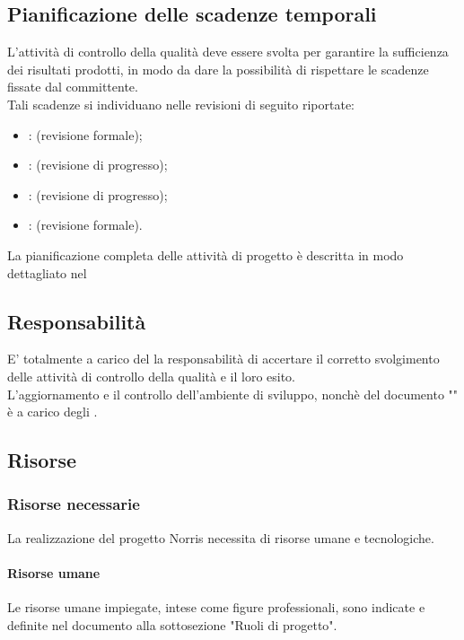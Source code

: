 	\subsection{Pianificazione delle scadenze temporali}
	L'attività di controllo della qualità deve essere svolta per garantire la sufficienza dei risultati prodotti, in modo da dare la possibilità di rispettare le scadenze fissate dal committente.\\
	Tali scadenze si individuano nelle revisioni di seguito riportate:
		\begin{itemize}
			\item {}:  (revisione formale);
			\item {}: (revisione di progresso);
			\item {}: (revisione di progresso);
			\item {}: (revisione formale).
		\end{itemize}
	La pianificazione completa delle attività di progetto è descritta in modo dettagliato nel 
	\subsection{Responsabilità}
	E' totalmente a carico del  la responsabilità di accertare il corretto svolgimento delle attività di controllo della qualità e il loro esito.\\
	L'aggiornamento e il controllo dell'ambiente di sviluppo, nonchè del documento "" è a carico degli .
	\subsection{Risorse}
	\subsubsection{Risorse necessarie}
	La realizzazione del progetto Norris necessita di risorse umane e tecnologiche.
	\paragraph{Risorse umane}
		Le risorse umane impiegate, intese come figure professionali, sono indicate e definite nel documento  alla sottosezione "Ruoli di progetto".
